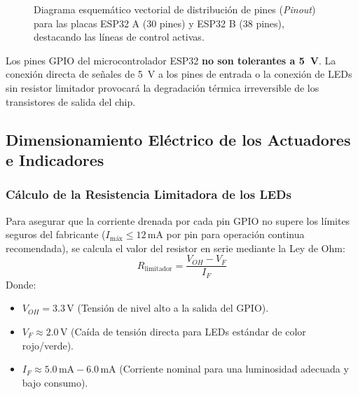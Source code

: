 \documentclass[11pt,a4paper]{article}
\begin{document}
\begin{figure}[htbp]
{%
    }
    \caption{Diagrama esquemático vectorial de distribución de pines (\textit{Pinout}) para las placas ESP32 A (30 pines) y ESP32 B (38 pines), destacando las líneas de control activas.}
    \label{fig:pinout_diagrama}
\end{figure}

\begin{warnbox}
    Los pines GPIO del microcontrolador ESP32 \textbf{no son tolerantes a 5~V}. La conexión directa de señales de 5~V a los pines de entrada o la conexión de LEDs sin resistor limitador provocará la degradación térmica irreversible de los transistores de salida del chip.
\end{warnbox}

\subsection{Dimensionamiento Eléctrico de los Actuadores e Indicadores}
\subsubsection{Cálculo de la Resistencia Limitadora de los LEDs}
Para asegurar que la corriente drenada por cada pin GPIO no supere los límites seguros del fabricante ($I_{\text{máx}} \le 12\,\text{mA}$ por pin para operación continua recomendada), se calcula el valor del resistor en serie mediante la Ley de Ohm:
\begin{equation}
    R_{\text{limitador}} = \frac{V_{OH} - V_F}{I_F}
\end{equation}
Donde:
\begin{itemize}
    \item $V_{OH} = 3.3\,\text{V}$ (Tensión de nivel alto a la salida del GPIO).
    \item $V_F \approx 2.0\,\text{V}$ (Caída de tensión directa para LEDs estándar de color rojo/verde).
    \item $I_F \approx 5.0\,\text{mA} - 6.0\,\text{mA}$ (Corriente nominal para una luminosidad adecuada y bajo consumo).
\end{itemize}
\end{document}
